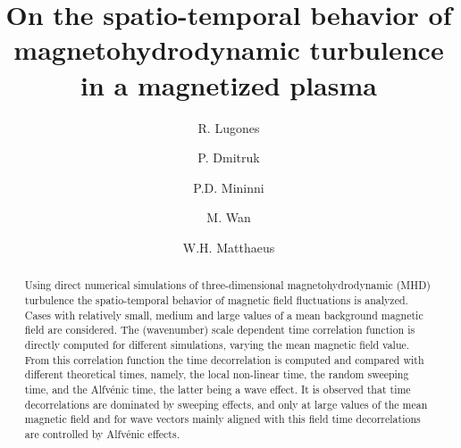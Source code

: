 \documentclass[aip,pop,reprint,amsmath,amssymb,floatfix]{revtex4-1}
\begin{document}
\title{On the spatio-temporal behavior of
magnetohydrodynamic turbulence in a magnetized plasma}

\author{R. Lugones}

\author{P. Dmitruk}

\author{P.D. Mininni}

\author{M. Wan}

\author{W.H. Matthaeus}


\begin{abstract}
  Using direct numerical simulations of three-dimensional magnetohydrodynamic (MHD)
  turbulence the spatio-temporal behavior of magnetic field
  fluctuations is analyzed.  Cases with relatively small, medium and
  large values of a mean background magnetic field are considered. The
  (wavenumber) scale dependent time correlation function is directly
  computed for different simulations, varying the mean magnetic field
  value. From this correlation function the time decorrelation is
  computed and compared with different theoretical times, namely,
  the local non-linear time, the random sweeping time, and the
  Alfv\'enic time, the latter being a wave effect. It is observed that
  time decorrelations are dominated by sweeping effects, and only at
  large values of the mean magnetic field and for wave vectors mainly
  aligned with this field time decorrelations are controlled by
  Alfv\'enic effects.
\end{abstract}

\maketitle
\end{document}
